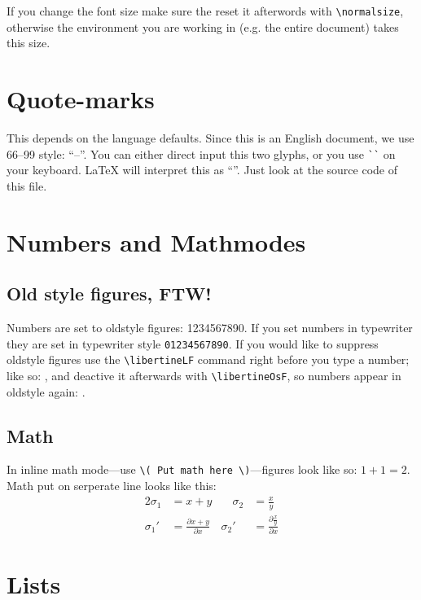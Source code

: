 If you change the font size make sure the reset it afterwords with \verb|\normalsize|, otherwise the environment you are working in (e.g. the entire document) takes this size. 

\section{Quote-marks}

This depends on the language defaults. Since this is an English document, we use 66--99 style: “--”. You can either direct input this two glyphs, or you use \verb|``|\textquotesingle{} \textquotesingle{} on your keyboard. \LaTeX{} will interpret this as ``''. Just look at the source code of this file.

\section{Numbers and Mathmodes}

\subsection{Old style figures, FTW!}

Numbers are set to oldstyle figures: 1234567890. If you set numbers in typewriter they are set in typewriter style \texttt{01234567890}. If you would like to suppress oldstyle figures use the \verb|\libertineLF| command right before you type a number; like so: , and deactive it afterwards with \verb|\libertineOsF|, so numbers appear in oldstyle again: .

\subsection{Math}

In inline math mode---use \verb|\( Put math here \)|---figures look like so: \(1 + 1 = 2\). Math put on serperate line looks like this:
\begin{alignat*}{2}
	\sigma_1 &= x + y  &\quad \sigma_2 &= \frac{x}{y} \\	
	\sigma_1' &= \frac{\partial x + y}{\partial x} & \sigma_2' 
	&= \frac{\partial \frac{x}{y}}{\partial x}
\end{alignat*}


\section{Lists}

